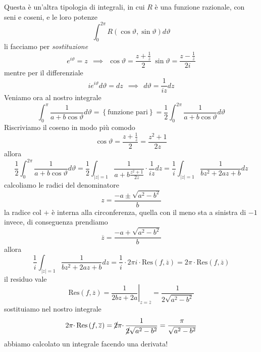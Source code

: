 Questa è un'altra tipologia di integrali, in cui $R$ è una funzione razionale, con seni e coseni, e le loro potenze
\begin{equation*}
\int ^{2\pi }_{0} R\left(\cos \vartheta ,\sin \vartheta \right) d\vartheta 
\end{equation*}
li facciamo per \textit{sostituzione}
\begin{equation*}
\boxed{e^{i\vartheta } =z} \ \ \implies \ \ \boxed{\cos \vartheta =\frac{z+\frac{1}{z}}{2}} \ \boxed{\sin \vartheta =\frac{z-\frac{1}{z}}{2i}}
\end{equation*}
mentre per il differenziale
\begin{equation*}
ie^{i\vartheta } d\vartheta =dz\ \ \implies \ \ \boxed{d\vartheta =\frac{1}{iz} dz}
\end{equation*}
Veniamo ora al nostro integrale
\begin{equation*}
\int ^{\pi }_{0}\frac{1}{a+b\cos \vartheta } d\vartheta =\left\{\text{funzione pari}\right\} =\frac{1}{2}\int ^{2\pi }_{0}\frac{1}{a+b\cos \vartheta } d\vartheta 
\end{equation*}
Riscriviamo il coseno in modo più comodo
\begin{equation*}
\cos \vartheta =\frac{z+\frac{1}{z}}{2} =\frac{z^{2} +1}{2z}
\end{equation*}
allora
\begin{equation*}
\frac{1}{2}\int ^{2\pi }_{0}\frac{1}{a+b\cos \vartheta } d\vartheta =\frac{1}{2}\int _{\left| z\right| =1}\frac{1}{a+b\frac{z^{2} +1}{2z}} \cdotp \frac{1}{iz} dz=\frac{1}{i}\int _{\left| z\right| =1}\frac{1}{bz^{2} +2az+b} dz
\end{equation*}
calcoliamo le radici del denominatore
\begin{equation*}
z=\frac{-a\pm \sqrt{a^{2} -b^{2}}}{b}
\end{equation*}
la radice col $+$ è interna alla circonferenza, quella con il meno sta a sinistra di $-1$ invece, di conseguenza prendiamo
\begin{equation*}
\overline{z} =\frac{-a+\sqrt{a^{2} -b^{2}}}{b}
\end{equation*}
allora
\begin{equation*}
\frac{1}{i}\int _{\left| z\right| =1}\frac{1}{bz^{2} +2az+b} dz=\frac{1}{i} \cdotp 2\pi i\cdotp \mathrm{Res}\left( f,\overline{z}\right) =2\pi \cdotp \mathrm{Res}\left( f,\overline{z}\right)
\end{equation*}
il residuo vale
\begin{equation*}
\mathrm{Res}\left( f,\overline{z}\right) =\left. \frac{1}{2bz+2a}\right| _{z=\overline{z}} =\frac{1}{2\sqrt{a^{2} -b^{2}}}
\end{equation*}
sostituiamo nel nostro integrale
\begin{equation*}
2\pi \cdotp \mathrm{Res}\left( f,\overline{z}\right) =\cancel{2} \pi \cdotp \frac{1}{\cancel{2}\sqrt{a^{2} -b^{2}}} =\frac{\pi }{\sqrt{a^{2} -b^{2}}}
\end{equation*}
abbiamo calcolato un integrale facendo una derivata!
\Soluzione


